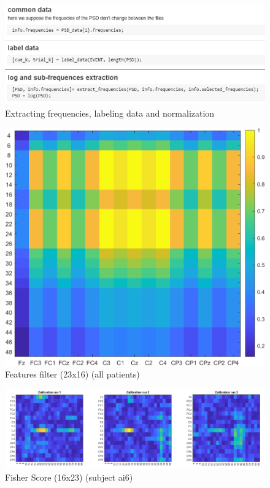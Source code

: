 \begin{itemize}
\begin{figure}[h!]
	\begin{center}
		 \includegraphics[width=0.6\linewidth]{img/code_extract_frequencies_normalize_data.PNG}
	\end{center}

	 \caption{Extracting frequencies, labeling data and normalization}
	 \label{fig:freq_data_norm}
\end{figure}


\begin{figure}[h!]
	\begin{center}
		 \includegraphics[width=0.4\linewidth]{img/features_filter.png}
	\end{center}

	 \caption{Features filter (23x16) (all patients)}
	 \label{fig:features_filter}
\end{figure}

\begin{figure}[h!]
	\begin{center}
		 \includegraphics[width=0.8\linewidth]{img/fisher_score_calibration_ai6.PNG}
	\end{center}

	 \caption{Fisher Score (16x23) (subject ai6)}
	 \label{fig:fisher_score_calibration_ai6}
\end{figure}


\end{itemize}
